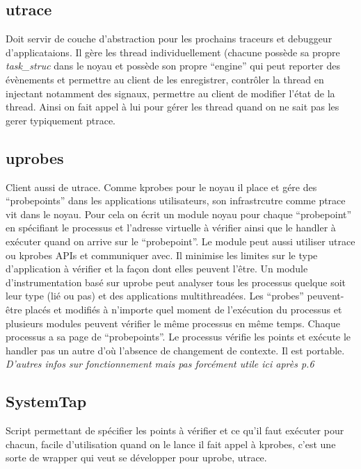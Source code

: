 \documentclass{article}
\begin{document}
\subsection{utrace}
Doit servir de couche d'abstraction pour les prochains traceurs et debuggeur d'applicataions. Il gère les thread individuellement (chacune possède sa propre \textit{task\_struc} dans le noyau et possède son propre ``engine'' qui peut reporter des évènements et permettre au client de les enregistrer, contrôler la thread en injectant notamment des signaux, permettre au client de modifier l'état de la thread. Ainsi on fait appel à lui pour gérer les thread quand on ne sait pas les gerer typiquement ptrace.

\subsection{uprobes}
Client aussi de utrace. Comme kprobes pour le noyau il place et gére des ``probepoints'' dans les applications utilisateurs, son infrastrcutre comme ptrace vit dans le noyau. Pour cela on écrit un module noyau pour chaque ``probepoint'' en spécifiant le processus et l'adresse virtuelle à vérifier ainsi que le handler à exécuter quand on arrive sur le ``probepoint''. Le module peut aussi utiliser utrace ou kprobes APIs et communiquer avec. Il minimise les limites sur le type d'application à vérifier et la façon dont elles peuvent l'être. Un module d'instrumentation basé sur uprobe peut analyser tous les processus quelque soit leur type (lié ou pas) et des applications multithreadées. Les ``probes'' peuvent-être placés et modifiés à n'importe quel moment de l'exécution du processus et plusieurs modules peuvent vérifier le même processus en même temps. Chaque processus a sa page de ``probepoints''. Le processus vérifie les points et exécute le handler pas un autre d'où l'absence de changement de contexte. Il est portable. \textit{D'autres infos sur fonctionnement mais pas forcément utile ici après p.6}

\subsection{SystemTap}
Script permettant de spécifier les points à vérifier et ce qu'il faut exécuter pour chacun, facile d'utilisation quand on le lance il fait appel à kprobes, c'est une sorte de wrapper qui veut se développer pour uprobe, utrace.
\end{document}

